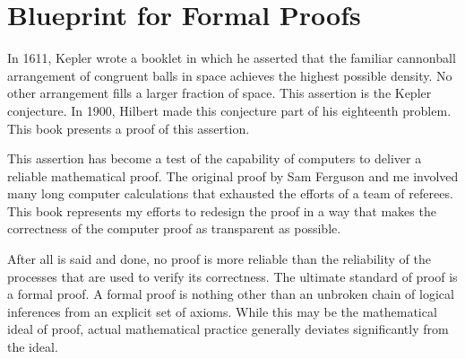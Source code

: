 \newpage

\section*{Blueprint for Formal Proofs}

In 1611, Kepler wrote a booklet in which he asserted that the familiar
cannonball arrangement of congruent balls in space achieves the
highest possible density.  No other arrangement fills a larger
fraction of space.  This assertion is the Kepler conjecture.  In 1900,
Hilbert made this conjecture part of his eighteenth problem.  This
book presents a proof of this assertion.

This assertion has become a test of the capability of
computers to deliver a reliable mathematical proof.  The original
proof by Sam Ferguson and me involved many long computer calculations
that exhausted the efforts of a team of referees.  This book represents my efforts
to redesign the proof in a way that makes the correctness of the computer proof as transparent
as possible.

After all is said and done, no proof is more reliable than the
reliability of the processes that are used to verify its
correctness.   The ultimate standard of proof is a formal proof.  A formal proof
is nothing other than an unbroken chain of logical inferences from an explicit set
of axioms.  While this may be the mathematical ideal of proof, actual mathematical
practice generally deviates significantly from the ideal.



%
%
%
%

